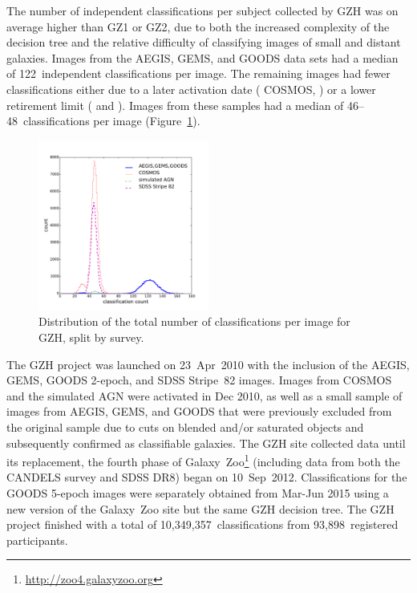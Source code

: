 \documentclass[a4paper,fleqn,usenatbib]{mnras}
\begin{document}
The number of independent classifications per subject collected by GZH was on
average higher than GZ1 or GZ2, due to both the increased complexity of the
decision tree and the relative difficulty of classifying images of small and
distant galaxies. Images from the \main{} AEGIS, GEMS, and GOODS data sets had
a median of 122~independent classifications per image. The remaining
images had fewer classifications either due to a later activation date (\main{} COSMOS, \simagn) or a lower
retirement limit (\stripe{} and \coadd). Images from these samples had a median
of 46--48~classifications per image (Figure~\ref{fig:classification_hist}).

\begin{figure}
\center
\includegraphics[width=0.5\textwidth]{figures/classification_hist.pdf}
\caption{Distribution of the total number of classifications per image for GZH,
split by survey.}
\label{fig:classification_hist}
\end{figure}

The GZH project was launched on 23~Apr~2010 with the inclusion of the AEGIS,
GEMS, GOODS 2-epoch, and SDSS Stripe~82 images. Images from COSMOS and the
simulated AGN were activated in Dec 2010, as well as a small sample of images
from AEGIS, GEMS, and GOODS that were previously excluded from the original
sample due to cuts on blended and/or saturated objects and subsequently
confirmed as classifiable galaxies. The GZH site collected data until its
replacement, the fourth phase of
Galaxy~Zoo\footnote{\url{http://zoo4.galaxyzoo.org}} (including data from both
the \hst{} CANDELS survey and SDSS DR8) began on 10~Sep~2012. Classifications
for the GOODS 5-epoch images were separately obtained from Mar-Jun 2015 using
a new version of the Galaxy~Zoo site but the same GZH decision tree.
The GZH project finished with a total of 10,349,357~classifications from
93,898~registered participants. 
\end{document}

